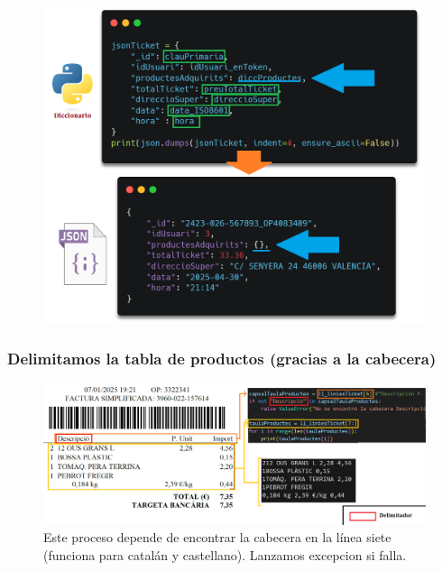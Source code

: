 \documentclass{beamer}
\begin{document}
		\begin{frame}
			\begin{figure}
				\centering
				\includegraphics[width=.8\linewidth]{imgEspecifiques/ticketExtraccioM.png}
				\label{fig:ticketExtraccioM}
			\end{figure}
		\end{frame}
	
	
	
	\begin{frame}	
		\frametitle{Delimitamos la tabla de productos (gracias a la cabecera)}
		\begin{figure}
			\centering
			\includegraphics[width=1\linewidth]{imgEspecifiques/ticketExtraccioN0}
			\caption{Este proceso depende de encontrar la cabecera en la línea siete (funciona para catalán y castellano). Lanzamos excepcion si falla.}
			\label{fig:ticketextraccionN0}
		\end{figure}
	\end{frame}
	
	
	
	
	
\end{document}
